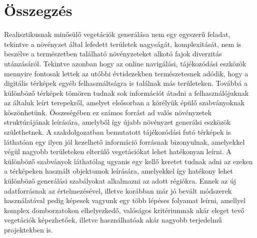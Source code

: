 \chapter{Összegzés}
\label{ch:sum}
Realisztikusnak minősülő vegetációk generálása nem egy egyszerű feladat, tekintve a növényzet által lefedett területek nagyságát, komplexitását, nem is beszélve a természetben található növényzeteket alkotó fajok diverzitás utánzásáról. Tekintve azonban hogy az online navigálási, tájékozódási eszközök  mennyire fontosak lettek az utóbbi évtidezekben természetesnek adódik, hogy a digitális térképek egyéb felhasználtságra is találnak más területeken. Továbbá a különböző térképek tömören tudnak sok információt átadni a felhasználójuknak az általuk leírt terepekről, amelyet elsősorban a körélyük épülő szabványoknak köszönhetünk. Összeségében ez számos forrást ad valós növényzetek struktúrájának leírására, amelyből így újabb növényzet generálsi eszközök születhetnek. \newline
A szakdolgozatban bemutatott tájékozódási futó térképek is láthatóan egy ilyen jól kezelhető információ forrásnak bizonyulnak, amelyekkel végül nagyobb területeken elterülő vegetációkat lehet hatékonyan leírni. A különböző szabványok láthatólag ugyanis egy kellő keretet tudnak adni az ezeken a térképeken használt objektumok leírására, amelyekkel így hatékony lehet különböző generálási szabályokat alkalmazni az adott régiókra.
Ennek az új adatforrásnak az értelmezésével, illetve korábban már jó bevált módszerek használatával pedig képesek vagyunk egy több lépéses folyamat leírni, amellyel komplex domborzatokon elhelyezkedő, valóságos kritériumnak akár eleget tevő vegetációk képezhetőek, illetve használhatóak akár nagyobb terjedelmű projektekben is. 


